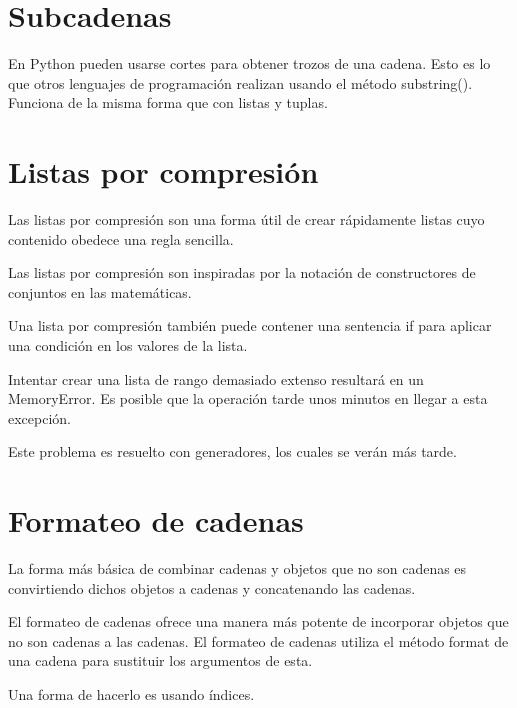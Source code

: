 \documentclass{report}
\begin{document}
\section{Subcadenas}

En Python pueden usarse cortes para obtener trozos de una cadena. Esto es lo que otros lenguajes de programación realizan usando el método substring(). Funciona de la misma forma que con listas y tuplas.


\section{Listas por compresión}

Las listas por compresión son una forma útil de crear rápidamente listas cuyo contenido obedece una regla sencilla.


Las listas por compresión son inspiradas por la notación de constructores de conjuntos en las matemáticas.

Una lista por compresión también puede contener una sentencia if para aplicar una condición en los valores de la lista.


Intentar crear una lista de rango demasiado extenso resultará en un MemoryError. Es posible que la operación tarde unos minutos en llegar a esta excepción.


Este problema es resuelto con generadores, los cuales se verán más tarde.

\section{Formateo de cadenas}

La forma más básica de combinar cadenas y objetos que no son cadenas es convirtiendo dichos objetos a cadenas y concatenando las cadenas.

El formateo de cadenas ofrece una manera más potente de incorporar objetos que no son cadenas a las cadenas. El formateo de cadenas utiliza el método format de una cadena para sustituir los argumentos de esta.

Una forma de hacerlo es usando índices.

\end{document}
